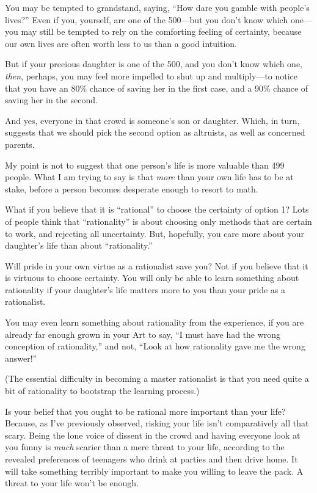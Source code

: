  You may be tempted to grandstand, saying, ``How
dare you gamble with people's
lives?'' Even if you, yourself, are one of the
500---but you don't know which one---you may still be
tempted to rely on the comforting feeling of certainty, because our own
lives are often worth less to us than a good intuition.


 But if your precious daughter is one of the 500, and you
don't know which one, \textit{then}, perhaps, you may
feel more impelled to shut up and multiply---to notice that you have an
80\% chance of saving her in the first case, and a 90\% chance of
saving her in the second.


 And yes, everyone in that crowd is someone's son
or daughter. Which, in turn, suggests that we should pick the second
option as altruists, as well as concerned parents.


 My point is not to suggest that one person's life
is more valuable than 499 people. What I am trying to say is that
\textit{more} than your own life has to be at stake, before a person
becomes desperate enough to resort to math.


 What if you believe that it is
``rational'' to choose the certainty
of option 1? Lots of people think that
``rationality'' is about choosing
only methods that are certain to work, and rejecting all uncertainty.
But, hopefully, you care more about your daughter's
life than about ``rationality.''


 Will pride in your own virtue as a rationalist save you? Not if
you believe that it is virtuous to choose certainty. You will only be
able to learn something about rationality if your
daughter's life matters more to you than your pride as
a rationalist.


 You may even learn something about rationality from the
experience, if you are already far enough grown in your Art to say,
``I must have had the wrong conception of
rationality,'' and not, ``Look at
how rationality gave me the wrong answer!''


 (The essential difficulty in becoming a master rationalist is that
you need quite a bit of rationality to bootstrap the learning
process.)


 Is your belief that you ought to be rational more important than
your life? Because, as I've previously observed,
risking your life isn't comparatively all that scary.
Being the lone voice of dissent in the crowd and having everyone look
at you funny is \textit{much} scarier than a mere threat to your life,
according to the revealed preferences of teenagers who drink at parties
and then drive home. It will take something terribly important to make
you willing to leave the pack. A threat to your life
won't be enough.


